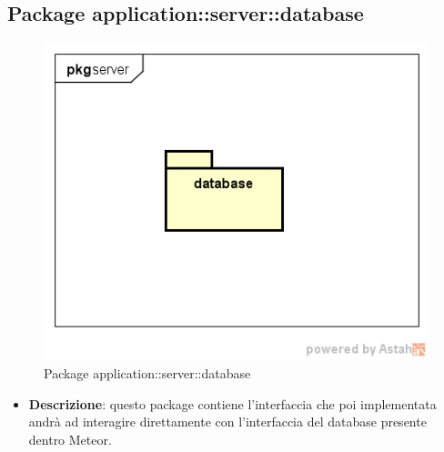 \subsection{Package application::server::database}
\label{Package application::server::database}
\begin{figure}[H]
	\centering
	\includegraphics[scale=0.6]{Sezioni/Packages/App/pck_server.png}
	\caption{Package application::server::database}
\end{figure}

\begin{itemize}
\item \textbf{Descrizione}: questo package contiene l'interfaccia che poi implementata andrà ad interagire direttamente con l'interfaccia del database presente dentro Meteor.
\end{itemize}

















